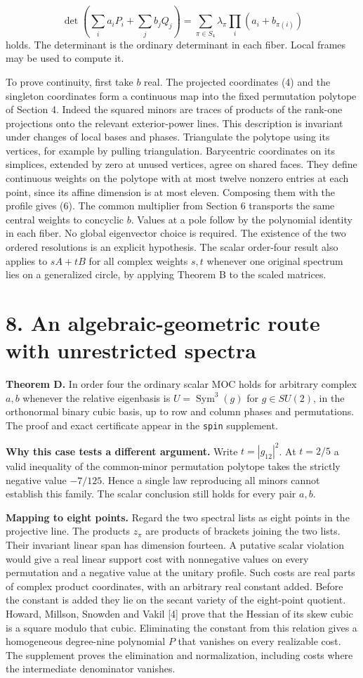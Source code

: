 \documentclass[11pt]{article}
\newcommand{\heading}[1]{\section*{\color{ink}#1}}
\begin{document}
\[
 \det\!\left(\sum_i a_iP_i+\sum_j b_j Q_j\right)
   =\sum_{\pi\in S_4}\lambda_\pi\prod_i(a_i+b_{\pi(i)}) \tag{6}
\]
holds. The determinant is the ordinary determinant in each fiber. Local frames may be used to compute it.
\par To prove continuity, first take $b$ real. The projected coordinates (4) and the singleton coordinates form a continuous map into the fixed permutation polytope of Section 4. Indeed the squared minors are traces of products of the rank-one projections onto the relevant exterior-power lines. This description is invariant under changes of local bases and phases. Triangulate the polytope using its vertices, for example by pulling triangulation. Barycentric coordinates on its simplices, extended by zero at unused vertices, agree on shared faces. They define continuous weights on the polytope with at most twelve nonzero entries at each point, since its affine dimension is at most eleven. Composing them with the profile gives (6). The common multiplier from Section 6 transports the same central weights to concyclic $b$. Values at a pole follow by the polynomial identity in each fiber. No global eigenvector choice is required. The existence of the two ordered resolutions is an explicit hypothesis. The scalar order-four result also applies to $sA+tB$ for all complex weights $s,t$ whenever one original spectrum lies on a generalized circle, by applying Theorem B to the scaled matrices.
\newpage
\heading{8. An algebraic-geometric route with unrestricted spectra}
\textbf{Theorem D.} In order four the ordinary scalar MOC holds for arbitrary complex $a,b$ whenever the relative eigenbasis is $U=\operatorname{Sym}^3(g)$ for $g\in SU(2)$, in the orthonormal binary cubic basis, up to row and column phases and permutations. The proof and exact certificate appear in the \texttt{spin} supplement.
\par\textbf{Why this case tests a different argument.} Write $t=|g_{12}|^2$. At $t=2/5$ a valid inequality of the common-minor permutation polytope takes the strictly negative value $-7/125$. Hence a single law reproducing all minors cannot establish this family. The scalar conclusion still holds for every pair $a,b$.
\par\textbf{Mapping to eight points.} Regard the two spectral lists as eight points in the projective line. The products $z_\pi$ are products of brackets joining the two lists. Their invariant linear span has dimension fourteen. A putative scalar violation would give a real linear support cost with nonnegative values on every permutation and a negative value at the unitary profile. Such costs are real parts of complex product coordinates, with an arbitrary real constant added. Before the constant is added they lie on the secant variety of the eight-point quotient. Howard, Millson, Snowden and Vakil [4] prove that the Hessian of its skew cubic is a square modulo that cubic. Eliminating the constant from this relation gives a homogeneous degree-nine polynomial $P$ that vanishes on every realizable cost. The supplement proves the elimination and normalization, including costs where the intermediate denominator vanishes.
\end{document}
